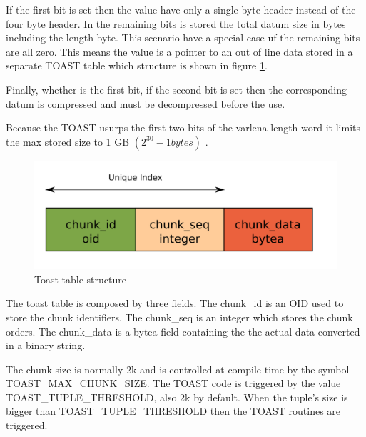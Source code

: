 If the first bit is set then the value have only a single-byte header instead of the four byte header. 
In the remaining bits is stored the total datum size in bytes including the length byte. This scenario 
have a special case uf the remaining bits are all zero. This means the value is a pointer to an out of line 
data stored in a separate TOAST table which structure is shown in figure \ref{fig:TOAST01}.\newline

Finally, whether is the first bit,  if the second bit is set then the corresponding datum is compressed and 
must be decompressed before the use.\newline

Because the TOAST usurps the first two bits of the varlena length word it limits the max stored size to 1 
GB  \begin{math} (2^{30} -1 bytes) \end{math} .

\begin{figure}[H]
\begin{center}

\includegraphics[scale=0.55]{images/toast_01.png}

\caption{Toast table structure}
\label{fig:TOAST01} 
\end{center}

\end{figure}

The toast table is composed by three fields. The chunk\_id is an OID used to store the chunk identifiers. 
The chunk\_seq is an integer which stores the chunk orders. The chunk\_data is a bytea field containing the 
the actual data converted in a binary string.\newline 

The chunk size is normally 2k and is controlled at compile time by the symbol TOAST\_MAX\_CHUNK\_SIZE. The 
TOAST code is triggered by the value TOAST\_TUPLE\_THRESHOLD, also 2k by default. When the tuple's size is 
bigger than TOAST\_TUPLE\_THRESHOLD then the TOAST routines are triggered.\newline

